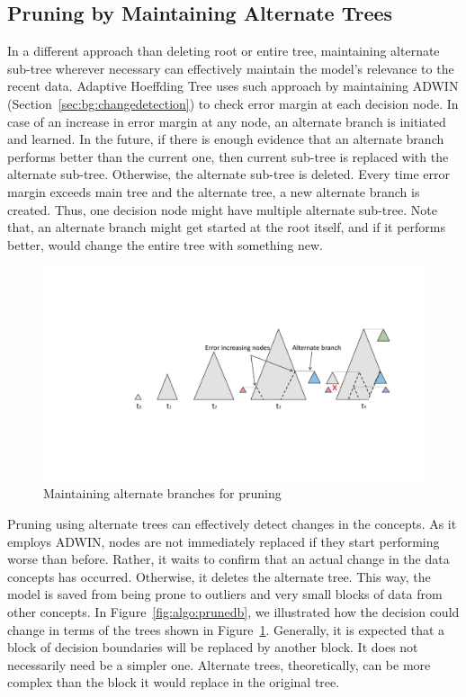 \subsection{Pruning by Maintaining Alternate Trees}
In a different approach than deleting root or entire tree, maintaining alternate sub-tree wherever necessary can effectively maintain the model's relevance to the recent data. Adaptive Hoeffding Tree uses such approach by maintaining ADWIN (Section~\ref{sec:bg:changedetection}) to check error margin at each decision node. In case of an increase in error margin at any node, an alternate branch is initiated and learned. In the future, if there is enough evidence that an alternate branch performs better than the current one, then current sub-tree is replaced with the alternate sub-tree. Otherwise, the alternate sub-tree is deleted. Every time error margin exceeds main tree and the alternate tree, a new alternate branch is created. Thus, one decision node might have multiple alternate sub-tree. Note that, an alternate branch might get started at the root itself, and if it performs better, would change the entire tree with something new.

\begin{figure}[htbp]
    \begin{center}
        \includegraphics[width=14.0cm]{figs/prune.pdf}
        \caption{Maintaining alternate branches for pruning}
        \label{fig:algo:prune}
    \end{center}
\end{figure}

Pruning using alternate trees can effectively detect changes in the concepts. As it employs ADWIN, nodes are not immediately replaced if they start performing worse than before. Rather, it waits to confirm that an actual change in the data concepts has occurred. Otherwise, it deletes the alternate tree. This way, the model is saved from being prone to outliers and very small blocks of data from other concepts. In Figure~\ref{fig:algo:prunedb}, we illustrated how the decision could change in terms of the trees shown in Figure~\ref{fig:algo:prune}. Generally, it is expected that a block of decision boundaries will be replaced by another block. It does not necessarily need be a simpler one. Alternate trees, theoretically, can be more complex than the block it would replace in the original tree.

